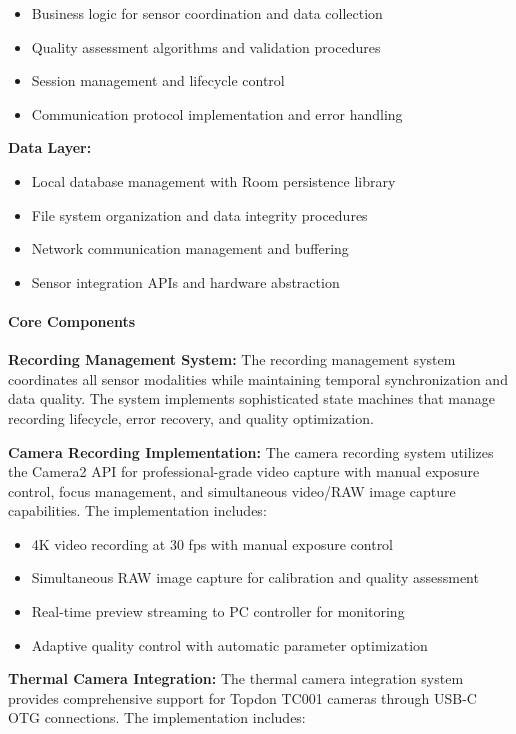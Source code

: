 \documentclass[12pt,a4paper]{report}
\begin{document}
\begin{itemize}
\item Business logic for sensor coordination and data collection
\item Quality assessment algorithms and validation procedures
\item Session management and lifecycle control
\item Communication protocol implementation and error handling

\end{itemize}
\textbf{Data Layer:}

\begin{itemize}
\item Local database management with Room persistence library
\item File system organization and data integrity procedures
\item Network communication management and buffering
\item Sensor integration APIs and hardware abstraction

\end{itemize}
\paragraph{Core Components}

\textbf{Recording Management System:}
The recording management system coordinates all sensor modalities while maintaining temporal synchronization and data
quality. The system implements sophisticated state machines that manage recording lifecycle, error recovery, and quality
optimization.

\textbf{Camera Recording Implementation:}
The camera recording system utilizes the Camera2 API for professional-grade video capture with manual exposure control,
focus management, and simultaneous video/RAW image capture capabilities. The implementation includes:

\begin{itemize}
\item 4K video recording at 30 fps with manual exposure control
\item Simultaneous RAW image capture for calibration and quality assessment
\item Real-time preview streaming to PC controller for monitoring
\item Adaptive quality control with automatic parameter optimization

\end{itemize}
\textbf{Thermal Camera Integration:}
The thermal camera integration system provides comprehensive support for Topdon TC001 cameras through USB-C OTG
connections. The implementation includes:
\end{document}
